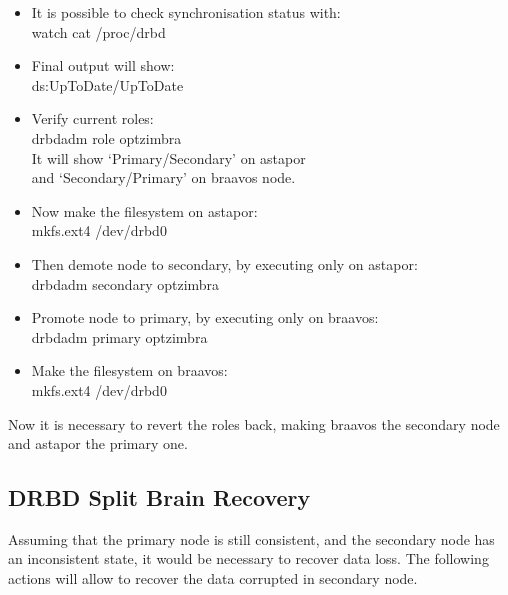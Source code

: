 \documentclass[a4paper, 12pt]{book}
\begin{document}
\begin{itemize}
	\item It is possible to check synchronisation status with:\\
		watch cat /proc/drbd

	\item Final output will show:\\
		ds:UpToDate/UpToDate

	\item Verify current roles:\\
		drbdadm role optzimbra\\
		It will show `Primary/Secondary' on astapor \\
		and `Secondary/Primary' on braavos node.

	\item Now make the filesystem on astapor:\\
		mkfs.ext4 /dev/drbd0

	\item Then demote node to secondary, by executing only on astapor:\\
		drbdadm secondary optzimbra

	\item Promote node to primary, by executing only on braavos:\\
		drbdadm primary optzimbra

	\item Make the filesystem on braavos:\\
		mkfs.ext4 /dev/drbd0

\end{itemize}

\noindent Now it is necessary to revert the roles back, making braavos the secondary node and astapor the primary one.


\subsection{DRBD Split Brain Recovery}
\label{sec:splitbrain}

\noindent Assuming that the primary node is still consistent, and the secondary node has an inconsistent state, it would be necessary to recover data loss. The following actions will allow to recover the data corrupted in secondary node.
\end{document}

